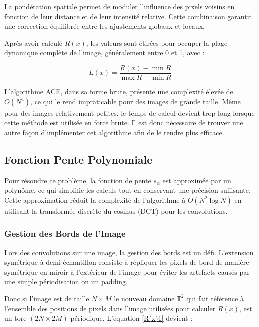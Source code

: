 \documentclass[10pt, a4paper]{extarticle}
\numberwithin{equation}{section}
\numberwithin{figure}{section}
\begin{document}
\par La pondération spatiale permet de moduler l'influence des pixels voisins en fonction de leur distance et de leur intensité relative. Cette combinaison garantit une correction équilibrée entre les ajustements globaux et locaux.
\par Après avoir calculé \( R(x) \), les valeurs sont étirées pour occuper la plage dynamique complète de l'image, généralement entre 0 et 1, avec :

\begin{equation}
L(x) = \frac{R(x) - \min R}{\max R - \min R}
\end{equation}

\par L'algorithme ACE, dans sa forme brute, présente une complexité élevée de \( O(N^4) \), ce qui le rend impraticable pour des images de grande taille. Même pour des images relativement petites, le temps de calcul devient trop long lorsque cette méthode est utilisée en force brute. Il est donc nécessaire de trouver une autre façon d'implémenter cet algorithme afin de le rendre plus efficace.

\subsection{Fonction Pente Polynomiale}
\par Pour résoudre ce problème, la fonction de pente \( s_\alpha \) est approximée par un polynôme, ce qui simplifie les calculs tout en conservant une précision suffisante. Cette approximation réduit la complexité de l'algorithme à \( O(N^2 \log N) \) en utilisant la transformée discrète du cosinus (DCT) pour les convolutions.


\subsubsection{Gestion des Bords de l'Image}
\par Lors des convolutions sur une image, la gestion des bords est un défi. L'extension symétrique à demi-échantillon consiste à répliquer les pixels de bord de manière symétrique en miroir à l'extérieur de l'image pour éviter les artefacts causés par une simple périodisation on un padding.
\par Donc si l'image est de taille $N\times M$ le nouveau domaine \( \mathbb{T}^2 \) qui fait référence à l'ensemble des positions de pixels dans l'image utilisées pour calculer \( R(x) \), est un tore $(2N\!\times\! 2M)$-périodique. L'équation \eqref{R(x)1} devient :
\end{document}

